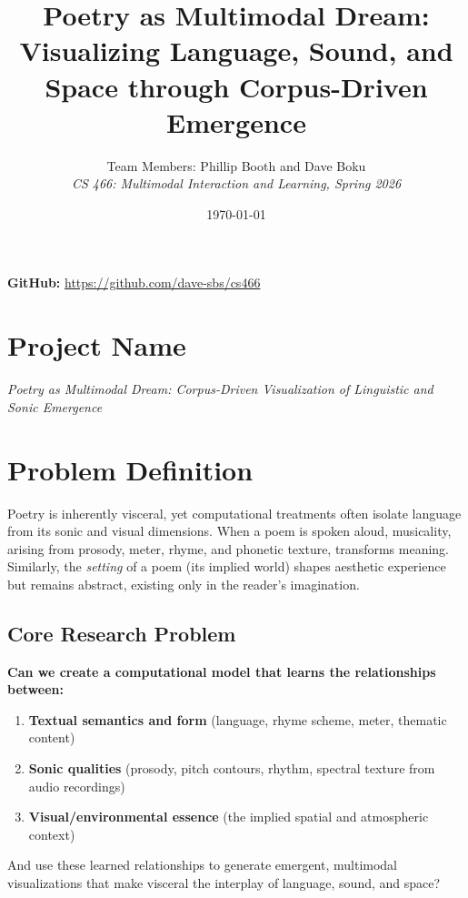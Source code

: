 \documentclass[11pt,a4paper]{article}
\title{\textbf{Poetry as Multimodal Dream: \\Visualizing Language, Sound, and Space through Corpus-Driven Emergence}}
\author{
  Team Members: Phillip Booth and Dave Boku \\
  \textit{CS 466: Multimodal Interaction and Learning, Spring 2026}
}
\date{\today}
\begin{document}
\maketitle

\begin{center}
  \small\textbf{GitHub:} \url{https://github.com/dave-sbs/cs466}
\end{center}

\section*{Project Name}
\textit{Poetry as Multimodal Dream: Corpus-Driven Visualization of Linguistic and Sonic Emergence}

\section*{Problem Definition}

Poetry is inherently visceral, yet computational treatments often isolate language from its sonic and visual dimensions. When a poem is spoken aloud, musicality, arising from prosody, meter, rhyme, and phonetic texture, transforms meaning. Similarly, the \textit{setting} of a poem (its implied world) shapes aesthetic experience but remains abstract, existing only in the reader's imagination.

\subsection*{Core Research Problem}
\textbf{Can we create a computational model that learns the relationships between:}
\begin{enumerate}
  \item \textbf{Textual semantics and form} (language, rhyme scheme, meter, thematic content)
  \item \textbf{Sonic qualities} (prosody, pitch contours, rhythm, spectral texture from audio recordings)
  \item \textbf{Visual/environmental essence} (the implied spatial and atmospheric context)
\end{enumerate}

\noindent And use these learned relationships to generate emergent, multimodal visualizations that make visceral the interplay of language, sound, and space?
\end{document}
